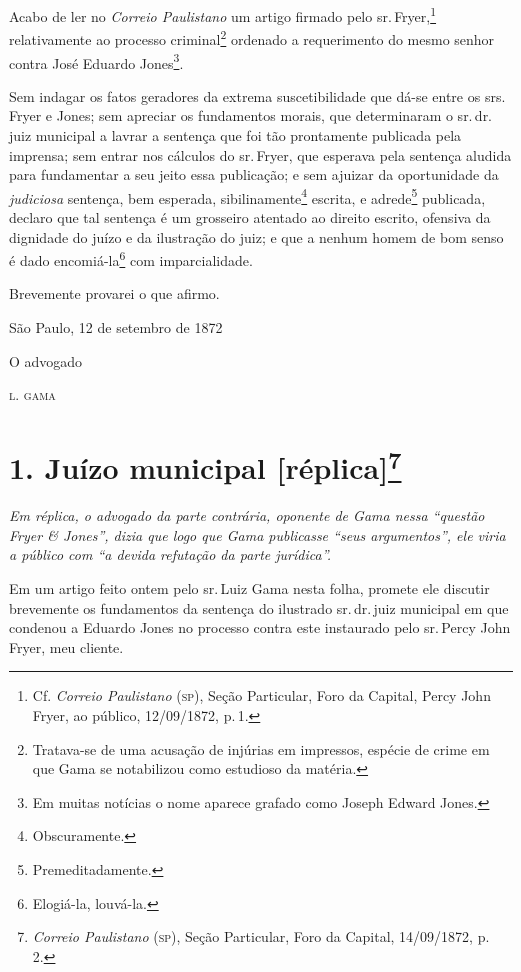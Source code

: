 Acabo de ler no \emph{Correio Paulistano} um artigo firmado pelo sr.\,Fryer,\footnote{ Cf. \emph{Correio Paulistano} (\textsc{sp}), Seção Particular,
  Foro da Capital, Percy John Fryer, ao público, 12/09/1872, p.\,1.}
relativamente ao processo criminal\footnote{ Tratava-se de uma acusação
  de injúrias em impressos, espécie de crime em que Gama se notabilizou
  como estudioso da matéria.} ordenado a requerimento do mesmo senhor
contra José Eduardo Jones\footnote{ Em muitas notícias o nome aparece
  grafado como Joseph Edward Jones.}.

Sem indagar os fatos geradores da extrema suscetibilidade que dá-se
entre os srs. Fryer e Jones; sem apreciar os fundamentos morais, que
determinaram o sr.\,dr.\,juiz municipal a lavrar a sentença que foi tão
prontamente publicada pela imprensa; sem entrar nos cálculos do sr.\,Fryer, que esperava pela sentença aludida para fundamentar a seu jeito
essa publicação; e sem ajuizar da oportunidade da \emph{judiciosa}
sentença, bem esperada, sibilinamente\footnote{ Obscuramente.} escrita,
e adrede\footnote{ Premeditadamente.} publicada, declaro que tal
sentença é um grosseiro atentado ao direito escrito, ofensiva da
dignidade do juízo e da ilustração do juiz; e que a nenhum homem de bom
senso é dado encomiá-la\footnote{ Elogiá-la, louvá-la.} com
imparcialidade.

Brevemente provarei o que afirmo.

\begin{flushright}
São Paulo, 12 de setembro de 1872

O advogado

\textsc{l. gama}
\end{flushright}

\chapter{1. Juízo municipal {[}réplica{]}\footnote{\emph{Correio Paulistano} (\textsc{sp}), Seção Particular, Foro
  da Capital, 14/09/1872, p.\,2.}} %

\begin{didascalia}
\emph{Em réplica, o advogado da parte contrária, oponente de Gama nessa
``questão Fryer \& Jones'', dizia que logo que Gama publicasse ``seus
argumentos'', ele viria a público com ``a devida refutação da parte
jurídica''.}
\end{didascalia}

Em um artigo feito ontem pelo sr.\,Luiz Gama nesta folha, promete ele
discutir brevemente os fundamentos da sentença do ilustrado sr.\,dr.\,juiz
municipal em que condenou a Eduardo Jones no processo contra este
instaurado pelo sr.\,Percy John Fryer, meu cliente.

